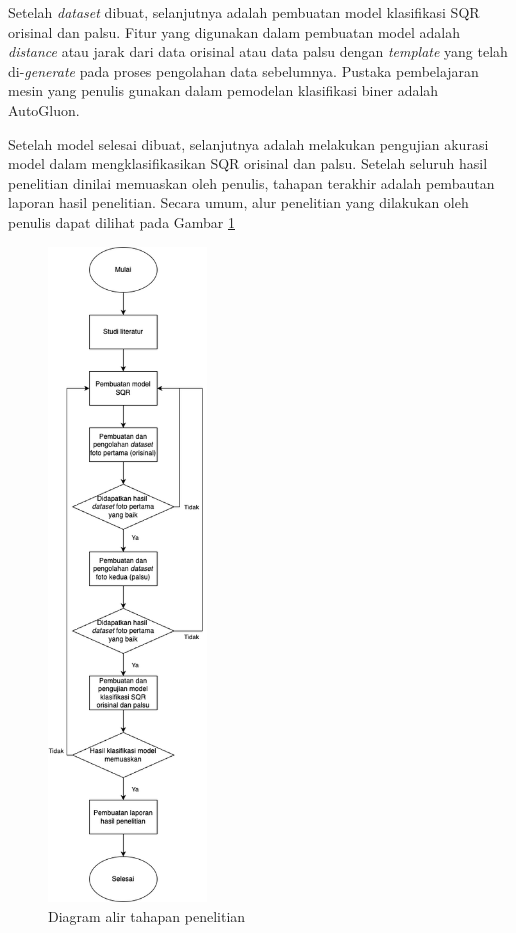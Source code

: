 Setelah \emph{dataset} dibuat, selanjutnya adalah pembuatan model klasifikasi SQR orisinal dan palsu. Fitur yang digunakan dalam pembuatan model adalah
\emph{distance} atau jarak dari data orisinal atau data palsu dengan \emph{template} yang telah di-\emph{generate} pada proses pengolahan data sebelumnya.
Pustaka pembelajaran mesin yang penulis gunakan dalam pemodelan klasifikasi biner adalah AutoGluon.

Setelah model selesai dibuat, selanjutnya adalah melakukan pengujian akurasi model dalam mengklasifikasikan SQR orisinal dan palsu. Setelah seluruh hasil
penelitian dinilai memuaskan oleh penulis, tahapan terakhir adalah pembautan laporan hasil penelitian. Secara umum, alur penelitian yang dilakukan oleh penulis
dapat dilihat pada Gambar \ref{Fig: 3-diagramalirpenelitian}

\begin{figure}[h]
	\centering
	\includegraphics[width=4.2cm]{contents/chapter-3/3-garisbesaralurpenelitian.png}
	\caption{Diagram alir tahapan penelitian}
	\label{Fig: 3-diagramalirpenelitian}
\end{figure}

